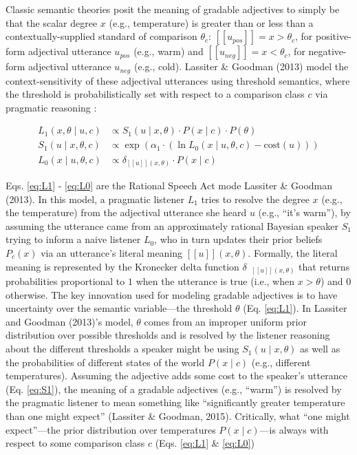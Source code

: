 \documentclass[doc]{apa6}
\begin{document}
Classic semantic theories posit the meaning of gradable adjectives to simply be that the scalar degree $x$ (e.g., temperature) is greater than or less than a contextually-supplied standard of comparison  \(\theta_c\): \([\![u_{pos}]\!] = x > \theta_c\), for positive-form adjectival utterance \(u_{pos}\) (e.g., warm) and \([\![u_{neg}]\!] = x < \theta_c\), for negative-form adjectival utterance \(u_{neg}\) (e.g., cold).
 Lassiter \& Goodman (2013) model the context-sensitivity of these adjectival utterances using threshold semantics, where
the threshold is probabilistically set with respect to a comparison class \(c\) via pragmatic reasoning :

\begin{align}
L_{1}(x, \theta \mid u, c) &\propto S_{1}(u \mid x, \theta) \cdot P(x \mid c) \cdot P(\theta) \label{eq:L1} \\
S_{1}(u \mid x, \theta, c) &\propto \exp{(\alpha_1 \cdot (\ln {L_{0}(x \mid u, \theta, c)} - \text{cost}(u)))} \label{eq:S1}\\
L_{0}(x \mid u, \theta, c) &\propto {\delta_{[\![u]\!](x, \theta)} \cdot P(x \mid c)} \label{eq:L0}
\end{align}

Eqs. \ref{eq:L1} - \ref{eq:L0} are the Rational Speech Act mode  Lassiter \& Goodman (2013). 
In this model, a pragmatic listener \(L_1\)
tries to resolve the degree \(x\) (e.g., the temperature)
from the adjectival utterance she heard \(u\) (e.g., ``it's warm''), by assuming the utterance came from an approximately rational Bayesian
speaker \(S_1\) trying to inform a naive listener \(L_0\), who in turn
updates their prior beliefs \(P_c(x)\) via an utterance's literal meaning
\([\![u]\!](x, \theta)\).
Formally, the literal meaning is represented by the
Kronecker delta function \(\delta_{\mbox{ $[\![ u ]\!]$}(x, \theta)}\)
that returns probabilities proportional to \(1\) when the utterance is
true (i.e., when \(x > \theta\)) and \(0\) otherwise.
The key innovation used for modeling gradable adjectives is to have uncertainty over the
semantic variable---the threshold \(\theta\) (Eq. \ref{eq:L1}). In
Lassiter and Goodman (2013)'s model, \(\theta\) comes from an improper uniform
prior distribution over possible thresholds and is resolved by the
listener reasoning about the different thresholds a speaker might be
using \(S_{1}(u \mid x, \theta)\) as well as the probabilities of
different states of the world \(P(x \mid c)\) (e.g., different
temperatures). Assuming the adjective adds some cost to the speaker's
utterance (Eq. \ref{eq:S1}), the meaning of a gradable adjectives (e.g.,
``warm'') is resolved by the pragmatic listener to mean something
like ``significantly greater temperature than one might expect''
(Lassiter \& Goodman, 2015). Critically, what ``one might
expect''---the prior distribution over temperatures \(P(x \mid c)\)---is
always with respect to some comparison class \(c\) (Eqs. \ref{eq:L1} \&
\ref{eq:L0})
\end{document}
